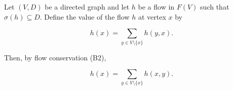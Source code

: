Let $(V, D)$ be a directed graph and let $h$ be a flow in $F(V)$ such that $\sigma(h) \subseteq D$. Define the value of the flow $h$ at vertex $x$ by

$$h(x) = \sum_{y \in V \setminus \{x\}} h(y, x).$$

Then, by flow conservation (B2),

$$h(x) = \sum_{y \in V \setminus \{x\}} h(x, y).$$

